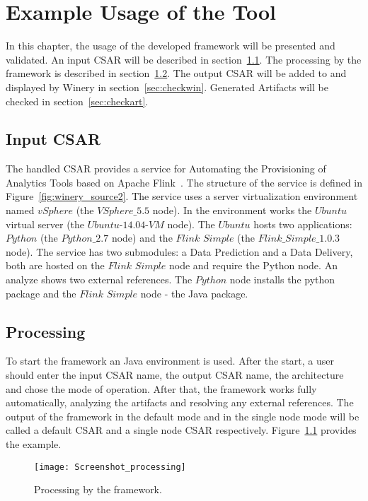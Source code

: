 
\chapter{Example Usage of the Tool}\label{chap:check}
In this chapter, the usage of the developed framework will be presented and validated.
An input CSAR will be described in section~\ref{sec:inputcsar}.
The processing by the framework is described in section~\ref{sec:process}.
The output CSAR will be added to and displayed by Winery in section~\ref{sec:checkwin}.
Generated Artifacts will be checked in section~\ref{sec:checkart}.

\section{Input CSAR}\label{sec:inputcsar}
The handled CSAR provides a service for Automating the Provisioning of Analytics Tools based on Apache Flink~\cite{csar_test}.
The structure of the service is defined in Figure~\ref{fig:winery_source2}. 
The service uses a server virtualization environment named $vSphere$ (the $VSphere\_5.5$ node). 
In the environment works the $Ubuntu$ virtual server (the $Ubuntu$-$14.04$-$VM$ node).
The $Ubuntu$ hosts two applications: $Python$ (the $Python\_2.7$ node) and the $Flink$ $Simple$ (the $Flink\_Simple\_1.0.3$ node).
The service has two submodules: a Data Prediction and a Data Delivery, both are hosted on the $Flink$ $Simple$ node and require the Python node. 
An analyze shows two external references. The $Python$ node installs the python package and the $Flink$ $Simple$ node - the Java package.

\section{Processing}\label{sec:process}
To start the framework an Java environment is used.
After the start, a user should enter the input CSAR name, the output CSAR name, the architecture and chose the mode of operation.
After that, the framework works fully automatically, analyzing the artifacts and resolving any external references.
The output of the framework in the default mode and in the single node mode will be called a default CSAR and a single node CSAR respectively.
Figure~\ref{fig:process} provides the example.
\begin{figure}[ht]   
	\centering
	\texttt{[image: Screenshot\_processing]}
	\caption{Processing by the framework.}
	\label{fig:process}
\end{figure}

